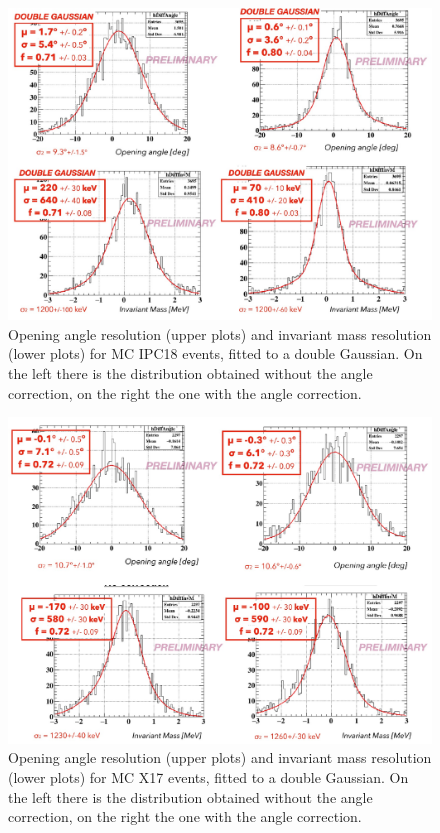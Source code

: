 \begin{refsection}
        \begin{figure}[]
            \centering
            \includegraphics[scale=0.5]{Figures/X17/Analysis/AngCorrReso.pdf}
            \caption[X17: IPC18 opening angle w/wo angular correction]{Opening angle resolution (upper plots) and invariant mass resolution (lower plots) for MC IPC18 events, fitted to a double Gaussian. On the left there is the distribution obtained without the angle correction, on the right the one with the angle correction.}
              \label{fig:corrIPC}
        \end{figure}
        \begin{figure}[]
            \centering
            \includegraphics[scale=0.5]{Figures/X17/Analysis/CorrAngleX17.pdf}
            \caption[X17: X17 opening angle w/wo angular correction]{Opening angle resolution (upper plots) and invariant mass resolution (lower plots) for MC X17 events, fitted to a double Gaussian. On the left there is the distribution obtained without the angle correction, on the right the one with the angle correction.}
            \label{fig:corrX17}
        \end{figure}


\end{refsection}
